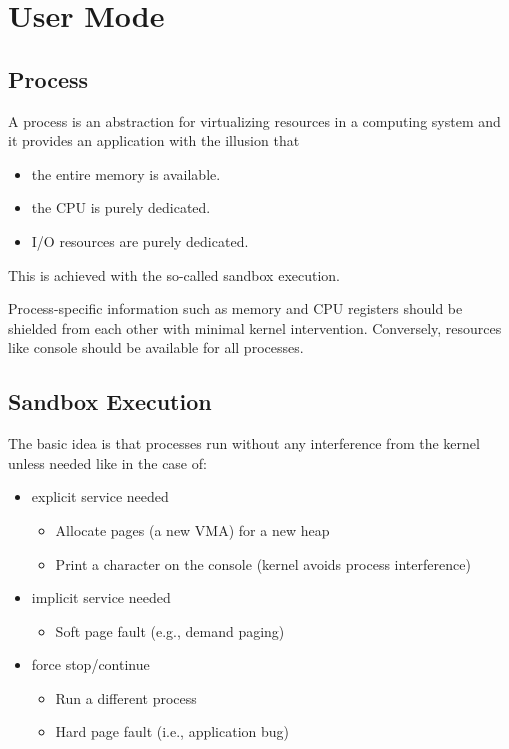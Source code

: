 \section{User Mode}

\subsection{Process}

A process is an abstraction for virtualizing resources in a computing system and it provides an application with the illusion that
\begin{itemize}
    \item the entire memory is available.
    \item the CPU is purely dedicated.
    \item I/O resources are purely dedicated.
\end{itemize}
This is achieved with the so-called sandbox execution.

\newpar{}

Process-specific information such as memory and CPU registers should be shielded from each other with minimal kernel intervention. Conversely, resources like console should be available for all processes.

\subsection{Sandbox Execution}
The basic idea is that processes run without any interference from the kernel unless needed like in the case of:
\begin{itemize}
    \item explicit service needed
          \begin{itemize}
              \item Allocate pages (a new VMA) for a new heap
              \item Print a character on the console (kernel avoids process interference)
          \end{itemize}
    \item implicit service needed
          \begin{itemize}
              \item Soft page fault (e.g., demand paging)
          \end{itemize}
    \item force stop/continue
          \begin{itemize}
              \item Run a different process
              \item Hard page fault (i.e., application bug)
          \end{itemize}
\end{itemize}

